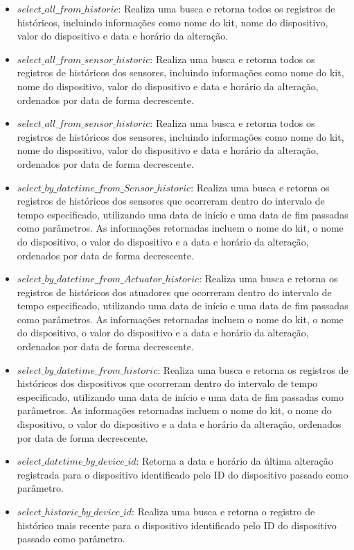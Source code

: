 \documentclass[conference, a4paper, 12pt]{IEEEtran}
\begin{document}
\begin{itemize}
  \item $select\_all\_from\_historic$: Realiza uma busca e retorna todos os registros de históricos, incluindo informações como nome do kit, nome do dispositivo, valor do dispositivo e data e horário da alteração.
  \item $select\_all\_from\_sensor\_historic$: Realiza uma busca e retorna todos os registros de históricos dos sensores, incluindo informações como nome do kit, nome do dispositivo, valor do dispositivo e data e horário da alteração, ordenados por data de forma decrescente.
  \item $select\_all\_from\_sensor\_historic$: Realiza uma busca e retorna todos os registros de históricos dos sensores, incluindo informações como nome do kit, nome do dispositivo, valor do dispositivo e data e horário da alteração, ordenados por data de forma decrescente.
  \item $select\_by\_datetime\_from\_Sensor\_historic$: Realiza uma busca e retorna os registros de históricos dos sensores que ocorreram dentro do intervalo de tempo especificado, utilizando uma data de início e uma data de fim passadas como parâmetros. As informações retornadas incluem o nome do kit, o nome do dispositivo, o valor do dispositivo e a data e horário da alteração, ordenados por data de forma decrescente.
  \item $select\_by\_datetime\_from\_Actuator\_historic$: Realiza uma busca e retorna os registros de históricos dos atuadores que ocorreram dentro do intervalo de tempo especificado, utilizando uma data de início e uma data de fim passadas como parâmetros. As informações retornadas incluem o nome do kit, o nome do dispositivo, o valor do dispositivo e a data e horário da alteração, ordenados por data de forma decrescente.
  \item $select\_by\_datetime\_from\_historic$: Realiza uma busca e retorna os registros de históricos dos dispositivos que ocorreram dentro do intervalo de tempo especificado, utilizando uma data de início e uma data de fim passadas como parâmetros. As informações retornadas incluem o nome do kit, o nome do dispositivo, o valor do dispositivo e a data e horário da alteração, ordenados por data de forma decrescente.
  \item $select\_datetime\_by\_device\_id$: Retorna a data e horário da última alteração registrada para o dispositivo identificado pelo ID do dispositivo passado como parâmetro.
  \item $select\_historic\_by\_device\_id$: Realiza uma busca e retorna o registro de histórico mais recente para o dispositivo identificado pelo ID do dispositivo passado como parâmetro.
\end{itemize}
\end{document}
